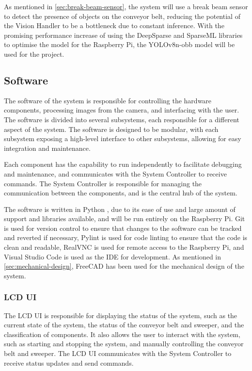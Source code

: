 As mentioned in \autoref{sec:break-beam-sensor}, the system will use a break beam sensor to detect the presence of objects on the conveyor belt, reducing the potential of the Vision Handler to be a bottleneck due to constant inference. With the promising performance increase of using the DeepSparse \cite{deepsparse} and SparseML \cite{sparseml} libraries to optimise the model for the Raspberry Pi, the YOLOv8n-obb model will be used for the project.



\subsection{Software}
\label{sec:electronics-and-software-integration}
The software of the system is responsible for controlling the hardware components, processing images from the camera, and interfacing with the user. The software is divided into several subsystems, each responsible for a different aspect of the system. The software is designed to be modular, with each subsystem exposing a high-level interface to other subsystems, allowing for easy integration and maintenance.

Each component has the capability to run independently to facilitate debugging and maintenance, and communicates with the System Controller to receive commands. The System Controller is responsible for managing the communication between the components, and is the central hub of the system.

The software is written in Python \cite{python}, due to its ease of use and large amount of support and libraries available, and will be run entirely on the Raspberry Pi. Git \cite{git} is used for version control to ensure that changes to the software can be tracked and reverted if necessary, Pylint \cite{pylint} is used for code linting to ensure that the code is clean and readable, RealVNC \cite{realvnc} is used for remote access to the Raspberry Pi, and Visual Studio Code \cite{vscode} is used as the IDE for development. As mentioned in \autoref{sec:mechanical-design}, FreeCAD \cite{freecad} has been used for the mechanical design of the system.

\subsubsection{LCD UI}
The LCD UI is responsible for displaying the status of the system, such as the current state of the system, the status of the conveyor belt and sweeper, and the classification of components. It also allows the user to interact with the system, such as starting and stopping the system, and manually controlling the conveyor belt and sweeper. The LCD UI communicates with the System Controller to receive status updates and send commands.

